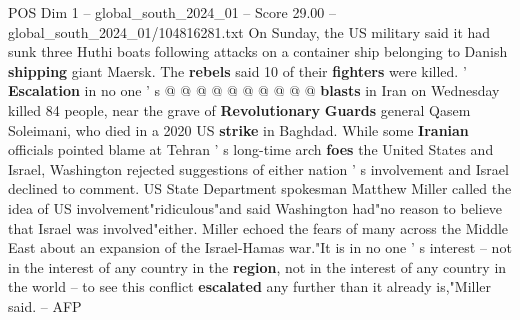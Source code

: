 \begin{textsample}{POS Dim 1 – global\_south\_2024\_01 – Score 29.00 – global\_south\_2024\_01/104816281.txt}
On Sunday, the US military said it had sunk three Huthi boats following attacks on a container ship belonging to Danish \textbf{shipping} giant Maersk.
The \textbf{rebels} said 10 of their \textbf{fighters} were killed. ' \textbf{Escalation} in no one ' s @ @ @ @ @ @ @ @ @ @ \textbf{blasts} in Iran on Wednesday killed 84 people, near the grave of \textbf{Revolutionary} \textbf{Guards} general Qasem Soleimani, who died in a 2020 US \textbf{strike} in Baghdad.
While some \textbf{Iranian} officials pointed blame at Tehran ' s long-time arch \textbf{foes} the United States and Israel, Washington rejected suggestions of either nation ' s involvement and Israel declined to comment.
US State Department spokesman Matthew Miller called the idea of US involvement"ridiculous"and said Washington had"no reason to believe that Israel was involved"either.
Miller echoed the fears of many across the Middle East about an expansion of the Israel-Hamas war."It is in no one ' s interest -- not in the interest of any country in the \textbf{region}, not in the interest of any country in the world -- to see this conflict \textbf{escalated} any further than it already is,"Miller said. -- AFP

\end{textsample}
